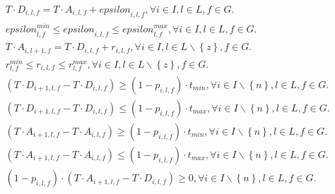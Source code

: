 \begin{align}
  &  & T \cdot D_{i , l , f} = T \cdot A_{i , l , f} + \mathit{epsilon}_{i , l , f} , \forall i \in I , l \in L , f \in G .  \tag{eq\_0001} \\
  &  & \mathit{epsilon}_{l , f}^{min} \leq \mathit{epsilon}_{i , l , f} \leq \mathit{epsilon}_{l , f}^{max} , \forall i \in I , l \in L , f \in G .  \tag{eq\_0002} \\
  &  & T \cdot A_{i , l + 1 , f} = T \cdot D_{i , l , f} + r_{i , l , f} , \forall i \in I , l \in L \backslash \left\{z\right\} , f \in G .  \tag{eq\_0003} \\
  &  & r_{l , f}^{min} \leq r_{i , l , f} \leq r_{l , f}^{max} , \forall i \in I , l \in L \backslash \left\{z\right\} , f \in G .  \tag{eq\_0004} \\
  &  & \left(T \cdot D_{i + 1 , l , f} - T \cdot D_{i , l , f}\right) \geq \left(1 - p_{i , l , f}\right) \cdot t_{min} , \forall i \in I \backslash \left\{n\right\} , l \in L , f \in G .  \tag{eq\_0005} \\
  &  & \left(T \cdot D_{i + 1 , l , f} - T \cdot D_{i , l , f}\right) \leq \left(1 - p_{i , l , f}\right) \cdot t_{max} , \forall i \in I \backslash \left\{n\right\} , l \in L , f \in G .  \tag{eq\_0006} \\
  &  & \left(T \cdot A_{i + 1 , l , f} - T \cdot A_{i , l , f}\right) \geq \left(1 - p_{i , l , f}\right) \cdot t_{min} , \forall i \in I \backslash \left\{n\right\} , l \in L , f \in G .  \tag{eq\_0007} \\
  &  & \left(T \cdot A_{i + 1 , l , f} - T \cdot A_{i , l , f}\right) \leq \left(1 - p_{i , l , f}\right) \cdot t_{max} , \forall i \in I \backslash \left\{n\right\} , l \in L , f \in G .  \tag{eq\_0008} \\
  &  & \left(1 - p_{i , l , f}\right) \cdot \left(T \cdot A_{i + 1 , l , f} - T \cdot D_{i , l , f}\right) \geq 0 , \forall i \in I \backslash \left\{n\right\} , l \in L , f \in G .  \tag{eq\_0009} \\

\end{align}

